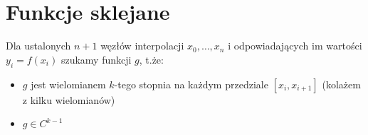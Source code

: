 \section{Funkcje sklejane}
Dla ustalonych \( n + 1 \) węzłów interpolacji \( x_0, \dots, x_n \) i odpowiadających im wartości  \( y_i = f(x_i) \) szukamy funkcji \( g \), t.że:
\begin{itemize}
	\onehalfspacing
	\item \( g \) jest wielomianem \( k \)-tego stopnia na każdym przedziale \( [x_i, x_{i+1}] \) (kolażem z kilku wielomianów)
	\item \( g \in C^{k-1} \)
\end{itemize}
